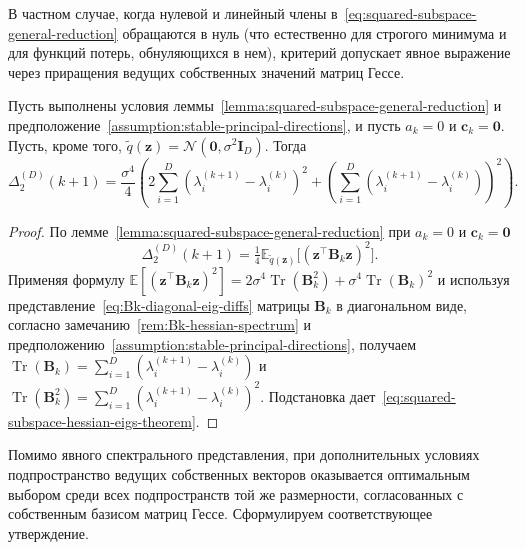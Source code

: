 В частном случае, когда нулевой и линейный члены в~\eqref{eq:squared-subspace-general-reduction} обращаются в нуль (что естественно для строгого минимума и для функций потерь, обнуляющихся в нем), критерий допускает явное выражение через приращения ведущих собственных значений матриц Гессе.

\begin{theorem}
    \label{thm:squared-subspace-hessian-eigs}
    Пусть выполнены условия леммы~\ref{lemma:squared-subspace-general-reduction} и предположение~\ref{assumption:stable-principal-directions}, и пусть $a_k = 0$ и $\mathbf c_k = \mathbf 0$. Пусть, кроме того, $\tilde q(\mathbf z)=\mathcal N(\mathbf 0,\sigma^2\mathbf I_D)$. Тогда
    \begin{equation}
        \label{eq:squared-subspace-hessian-eigs-theorem}
        \Delta_{2}^{(D)}(k+1)
        =
        \frac{\sigma^4}{4}
        \left(
            2\sum_{i=1}^{D}
            \left(
                \lambda_i^{(k+1)}-\lambda_i^{(k)}
            \right)^2
            +
            \left(
                \sum_{i=1}^{D}
                \left(
                    \lambda_i^{(k+1)}-\lambda_i^{(k)}
                \right)
            \right)^2
        \right).
    \end{equation}
\end{theorem}

\begin{proof}
    По лемме~\ref{lemma:squared-subspace-general-reduction} при $a_k=0$ и $\mathbf c_k=\mathbf 0$
    \begin{equation}
        \Delta_{2}^{(D)}(k+1) = \tfrac14 \mathbb E_{\tilde q(\mathbf z)} \big[ (\mathbf z^\top \mathbf B_k \mathbf z)^2 \big].
    \end{equation}
    Применяя формулу $\mathbb E[(\mathbf z^\top \mathbf B_k \mathbf z)^2] = 2\sigma^4 \operatorname{Tr}(\mathbf B_k^2) + \sigma^4 \operatorname{Tr}(\mathbf B_k)^2$ и используя представление~\eqref{eq:Bk-diagonal-eig-diffs} матрицы $\mathbf B_k$ в диагональном виде, согласно замечанию~\ref{rem:Bk-hessian-spectrum} и предположению~\ref{assumption:stable-principal-directions}, получаем $\operatorname{Tr}(\mathbf B_k) = \sum_{i=1}^{D} (\lambda_i^{(k+1)}-\lambda_i^{(k)})$ и $\operatorname{Tr}(\mathbf B_k^2) = \sum_{i=1}^{D} (\lambda_i^{(k+1)}-\lambda_i^{(k)})^2$. Подстановка дает~\eqref{eq:squared-subspace-hessian-eigs-theorem}.
\end{proof}

Помимо явного спектрального представления, при дополнительных условиях подпространство ведущих собственных векторов оказывается оптимальным выбором среди всех подпространств той же размерности, согласованных с собственным базисом матриц Гессе. Сформулируем соответствующее утверждение.

